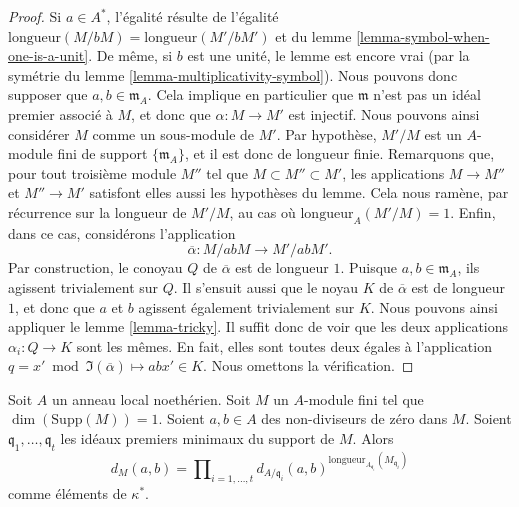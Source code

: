 \begin{proof}
Si $a \in A^*$, l'égalité résulte de
l'égalité $\text{longueur}(M/bM) = \text{longueur}(M'/bM')$
et du lemme \ref{lemma-symbol-when-one-is-a-unit}.
De même, si $b$ est une unité, le lemme est encore vrai
(par la symétrie du lemme \ref{lemma-multiplicativity-symbol}).
Nous pouvons donc supposer que $a, b \in \mathfrak m_A$.
Cela implique en particulier que $\mathfrak m$ n'est pas
un idéal premier associé à $M$, et donc que $\alpha : M \to M'$
est injectif. Nous pouvons ainsi considérer $M$ comme un sous-module de $M'$.
Par hypothèse, $M'/M$ est un $A$-module fini de support
$\{\mathfrak m_A\}$, et il est donc de longueur finie.
Remarquons que, pour tout troisième module $M''$ tel que $M \subset M'' \subset M'$,
les applications $M \to M''$ et $M'' \to M'$ satisfont elles aussi les hypothèses du lemme.
Cela nous ramène, par récurrence sur la longueur de $M'/M$,
au cas où $\text{longueur}_A(M'/M) = 1$.
Enfin, dans ce cas, considérons l'application
$$
\overline{\alpha} : M/abM \longrightarrow M'/abM'.
$$
Par construction, le conoyau $Q$ de $\overline{\alpha}$ est de
longueur $1$. Puisque $a, b \in \mathfrak m_A$, ils agissent trivialement sur
$Q$. Il s'ensuit aussi que le noyau $K$ de $\overline{\alpha}$ est de
longueur $1$, et donc que $a$ et $b$ agissent également trivialement sur $K$.
Nous pouvons ainsi appliquer le lemme \ref{lemma-tricky}. Il suffit donc de voir
que les deux applications $\alpha_i : Q \to K$ sont les mêmes.
En fait, elles sont toutes deux égales à l'application
$q = x' \bmod \Im(\overline{\alpha}) \mapsto abx' \in K$.
Nous omettons la vérification.
\end{proof}

\begin{lemma}
\label{lemma-compute-symbol-M}
Soit $A$ un anneau local noethérien.
Soit $M$ un $A$-module fini tel que $\dim(\text{Supp}(M)) = 1$.
Soient $a, b \in A$ des non-diviseurs de zéro dans $M$.
Soient $\mathfrak q_1, \ldots, \mathfrak q_t$ les idéaux premiers minimaux
du support de $M$. Alors
$$
d_M(a, b)
=
\prod\nolimits_{i = 1, \ldots, t}
d_{A/\mathfrak q_i}(a, b)^{
\text{longueur}_{A_{\mathfrak q_i}}(M_{\mathfrak q_i})}
$$
comme éléments de $\kappa^*$.
\end{lemma}

